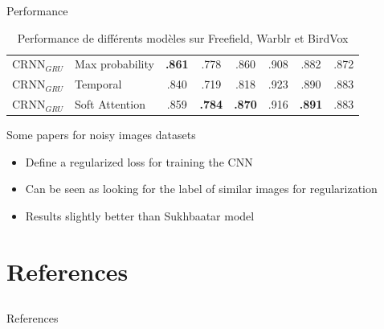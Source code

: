 \documentclass[compress,xcolor=table]{beamer}
\begin{document}
\begin{frame}{Performance}
\begin{table}[h]
{\begin{tabular}{llcccccc}
                \midrule
                $\textrm{CRNN}_{GRU}$                   & Max probability          & \textbf{.861}                     & .778                           & .860                        & .908          & .882          & .872          \\
                $\textrm{CRNN}_{GRU}$                   & Temporal                 & .840                              & .719                           & .818                        & .923          & .890          & .883          \\
                $\textrm{CRNN}_{GRU}$                   & Soft Attention           & .859                              & \textbf{.784}                  & \textbf{.870}               & .916          & \textbf{.891} & .883          \\
                \bottomrule
            \end{tabular}
        }
        \caption{Performance de différents modèles sur Freefield, Warblr et BirdVox}
        \label{tab:performance}
    \end{table}

\end{frame}

\begin{frame}{Some papers for noisy images datasets}

    \begin{exampleblock}{ \cite{cakirConvolutionalRecurrentNeural2017a}}

        \begin{itemize}
            \item
                  Define a regularized loss for training the CNN
            \item
                  Can be seen as looking for the label of similar images for
                  regularization
            \item
                  Results slightly better than Sukhbaatar model
        \end{itemize}

    \end{exampleblock}

\end{frame}

\section{References} \subsection{}

\begin{frame}[allowframebreaks]{References}

    \printbibliography[heading=none]

\end{frame}
\end{document}
